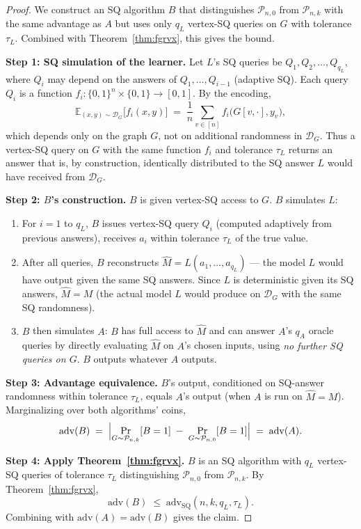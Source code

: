 \documentclass[11pt,a4paper]{article}
\theoremstyle{definition}
\theoremstyle{remark}
\newcommand{\Pnk}{\mathcal{P}_{n,k}}
\newcommand{\Pnzero}{\mathcal{P}_{n,0}}
\newcommand{\DG}{\mathcal{D}_G}
\newcommand{\Adv}{\mathrm{adv}}
\newcommand{\AdvSQ}{\Adv_{\mathrm{SQ}}}
\newcommand{\Ex}{\mathbb{E}}
\newcommand{\bits}{\{0,1\}}
\begin{document}
\begin{proof}
We construct an SQ algorithm $B$ that distinguishes $\Pnzero$ from $\Pnk$ with the same advantage as $A$ but uses only $q_L$ vertex-SQ queries on $G$ with tolerance $\tau_L$. Combined with Theorem~\ref{thm:fgrvx}, this gives the bound.

\textbf{Step 1: SQ simulation of the learner.} Let $L$'s SQ queries be $Q_1, Q_2, \ldots, Q_{q_L}$, where $Q_i$ may depend on the answers of $Q_1, \ldots, Q_{i-1}$ (adaptive SQ). Each query $Q_i$ is a function $f_i \colon \bits^n \times \bits \to [0, 1]$. By the encoding,
\[
\Ex_{(x, y) \sim \DG}\bigl[f_i(x, y)\bigr] \;=\; \frac{1}{n} \sum_{v \in [n]} f_i\bigl(G[v, \cdot], y_v\bigr),
\]
which depends only on the graph $G$, not on additional randomness in $\DG$. Thus a vertex-SQ query on $G$ with the same function $f_i$ and tolerance $\tau_L$ returns an answer that is, by construction, identically distributed to the SQ answer $L$ would have received from $\DG$.

\textbf{Step 2: $B$'s construction.} $B$ is given vertex-SQ access to $G$. $B$ simulates $L$:
\begin{enumerate}[label=(\arabic*),leftmargin=*]
  \item For $i = 1$ to $q_L$, $B$ issues vertex-SQ query $Q_i$ (computed adaptively from previous answers), receives $a_i$ within tolerance $\tau_L$ of the true value.
  \item After all queries, $B$ reconstructs $\widehat{M} = L(a_1, \ldots, a_{q_L})$ --- the model $L$ would have output given the same SQ answers. Since $L$ is deterministic given its SQ answers, $\widehat{M} = M$ (the actual model $L$ would produce on $\DG$ with the same SQ randomness).
  \item $B$ then simulates $A$: $B$ has full access to $\widehat{M}$ and can answer $A$'s $q_A$ oracle queries by directly evaluating $\widehat{M}$ on $A$'s chosen inputs, using \emph{no further SQ queries on $G$}. $B$ outputs whatever $A$ outputs.
\end{enumerate}

\textbf{Step 3: Advantage equivalence.} $B$'s output, conditioned on SQ-answer randomness within tolerance $\tau_L$, equals $A$'s output (when $A$ is run on $\widehat{M} = M$). Marginalizing over both algorithms' coins,
\[
\Adv(B) \;=\; \Bigl| \Pr_{G \sim \Pnk}[B = 1] \;-\; \Pr_{G \sim \Pnzero}[B = 1] \Bigr| \;=\; \Adv(A).
\]

\textbf{Step 4: Apply Theorem~\ref{thm:fgrvx}.} $B$ is an SQ algorithm with $q_L$ vertex-SQ queries of tolerance $\tau_L$ distinguishing $\Pnzero$ from $\Pnk$. By Theorem~\ref{thm:fgrvx},
\[
\Adv(B) \;\le\; \AdvSQ(n, k, q_L, \tau_L).
\]
Combining with $\Adv(A) = \Adv(B)$ gives the claim.
\end{proof}
\end{document}
